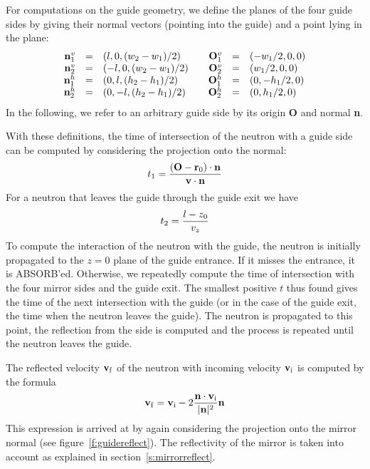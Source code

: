 For computations on the guide geometry, we define the planes of the four
guide sides by giving their normal vectors (pointing into the guide)
and a point lying in the plane:
$$
\begin{array}{rclcrcl}
{\bf n}^v_1 &=& (l, 0, {(w_2 - w_1) / 2})
     & & {\bf O}^v_1 &=& (- w_1 / 2, 0, 0) \\
{\bf n}^v_2 &=& (-l, 0, {(w_2 - w_1) / 2})
     & & {\bf O}^v_2 &=& (w_1 / 2, 0, 0) \\
{\bf n}^h_1 &=& (0, l, {(h_2 - h_1) / 2})
     & & {\bf O}^h_1 &=& (0, - h_1 / 2, 0) \\
{\bf n}^h_2 &=& (0, -l, {(h_2 - h_1) / 2})
     & & {\bf O}^h_2 &=& (0, h_1 / 2, 0) \\
\end{array}
$$
In the following, we refer to an arbitrary guide side by its origin
{\bf O} and normal {\bf n}.

With these definitions, the time of intersection of the neutron with a
guide side can be computed by considering the projection onto the
normal:
\begin{equation}
t_1 = {({\bf O} - {\bf r}_0) \cdot {\bf n} \over {\bf v} \cdot {\bf n}}
\end{equation}
For a neutron that leaves the guide through the guide exit we have
\begin{equation}
t_2 = {l - z_0 \over v_z}
\end{equation}
To compute the interaction of the neutron
with the guide, the neutron is initially propagated to the $z = 0$ plane of the
guide entrance. If it misses the entrance, it is ABSORB'ed. Otherwise,
we repeatedly compute the time of intersection with the
four mirror sides and the guide exit. The smallest positive $t$ thus
found gives the time of the next intersection with the guide (or in the
case of the guide exit, the time when the neutron leaves the guide). The
neutron is propagated to this point, the reflection from the side is
computed and the process is repeated until the neutron leaves the guide.

The reflected velocity ${\bf v}_{\rm f}$ of the neutron with incoming velocity
${\bf v}_{\rm i}$ is computed by the formula
\begin{equation}
 {\bf v}_{\rm f} =
  {\bf v}_{\rm i}
   - 2{{\bf n} \cdot {\bf v}_{\rm i} \over {|{\bf n}|^2}} {\bf n}
\end{equation}
This expression is arrived at by again considering the projection onto
the mirror normal (see figure~\ref{f:guidereflect}). The reflectivity of the
mirror is taken into account as explained in section~\ref{s:mirrorreflect}.

